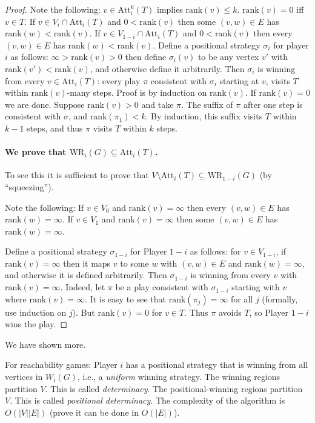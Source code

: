 \documentclass[a4paper,10pt]{article}
\newcommand{\rank}{\textrm{rank}}
\newcommand{\WR}{\textrm{WR}}
\newcommand{\att}{\textrm{Att}}
\begin{document}
\begin{proof}
Note the following:
\en
\- $v \in \att_i^k(T)$ implies $\rank(v) \leq k$.
\- $\rank(v) = 0$ iff $v \in T$.
\- If $v \in V_i \cap \att_i(T)$ and $0 < \rank(v)$ then some $(v,w) \in E$ has $\rank(w) < \rank(v)$.
\- If $v \in V_{1-i} \cap \att_i(T)$ and $0 < \rank(v)$ then every $(v,w) \in E$ has $\rank(w) < \rank(v)$.
\ne
Define a positional strategy $\sigma_i$ for player $i$ as follows: $\infty > \rank(v) > 0$ then define $\sigma_i(v)$ to be any vertex $v'$ with $\rank(v') < \rank(v)$, 
and otherwise define it arbitrarily.
Then $\sigma_i$ is winning from every $v \in \att_i(T)$: every play $\pi$ consistent with $\sigma_i$ starting at $v$, visits $T$ within $\rank(v)$-many steps. Proof is by induction on $\rank(v)$. If $\rank(v) = 0$ we are done. Suppose $ \rank(v) > 0$ and take $\pi$. The suffix of $\pi$ after one step is consistent with $\sigma$, and $\rank(\pi_1) < k$. By induction, this suffix visits $T$ within $k-1$ steps, and thus $\pi$ visits $T$ within $k$ steps.

\paragraph{We prove that $\WR_i(G) \subseteq \att_i(T)$.}

To see this it is sufficient to prove that $V \setminus \att_i(T) \subseteq \WR_{1-i}(G)$ (by ``squeezing'').


Note the following:
\en
\- If $v \in V_0$ and $\rank(v) = \infty$ then every $(v,w) \in E$ has $\rank(w) = \infty$.
\- If $v \in V_1$ and $\rank(v) = \infty$ then some $(v,w) \in E$ has $\rank(w) = \infty$.
\ne

Define a positional strategy $\sigma_{1-i}$ for Player $1-i$ as follows: for $v \in V_{1-i}$, if $\rank(v) = \infty$ then it maps $v$ to some $w$ with $(v,w) \in E$ and $\rank(w) = \infty$, and otherwise it is defined arbitrarily. Then $\sigma_{1-i}$ is winning from every $v$ with $\rank(v) = \infty$. Indeed, let $\pi$ be a play consistent with $\sigma_{1-i}$ starting with $v$ where $\rank(v) = \infty$. It is easy to see that $\rank(\pi_j) = \infty$ for all $j$ (formally, use induction on $j$). But $\rank(v) = 0$ for $v \in T$. Thus $\pi$ avoids $T$, so Player $1-i$ wins the play. 
\end{proof}

We have shown more. 

\begin{corollary} 
For reachability games:
\en
\- Player $i$ has a positional strategy that is winning from all vertices in $W_i(G)$, i.e., a \emph{uniform} winning strategy.
\- The winning regions partition $V$. This is called \emph{determinacy}.
\- The positional-winning regions partition $V$. This is called \emph{positional determinacy}.
\- The complexity of the algorithm is $O(|V||E|)$ (prove it can be done in $O(|E|)$).
\ne 
\end{corollary}
\end{document}
